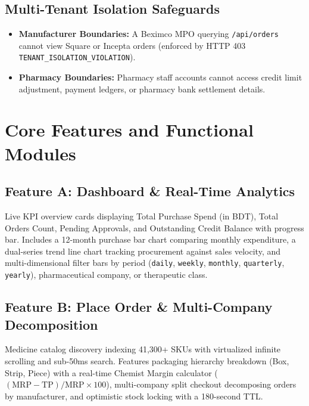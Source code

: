 \documentclass[10pt,a4paper]{article}
\begin{document}
\subsection{Multi-Tenant Isolation Safeguards}
\begin{itemize}[leftmargin=*]
    \item \textbf{Manufacturer Boundaries:} A Beximco MPO querying \texttt{/api/orders} cannot view Square or Incepta orders (enforced by HTTP 403 \texttt{TENANT\_ISOLATION\_VIOLATION}).
    \item \textbf{Pharmacy Boundaries:} Pharmacy staff accounts cannot access credit limit adjustment, payment ledgers, or pharmacy bank settlement details.
\end{itemize}

\section{Core Features and Functional Modules}

\subsection{Feature A: Dashboard \& Real-Time Analytics}
Live KPI overview cards displaying Total Purchase Spend (in BDT), Total Orders Count, Pending Approvals, and Outstanding Credit Balance with progress bar. Includes a 12-month purchase bar chart comparing monthly expenditure, a dual-series trend line chart tracking procurement against sales velocity, and multi-dimensional filter bars by period (\texttt{daily}, \texttt{weekly}, \texttt{monthly}, \texttt{quarterly}, \texttt{yearly}), pharmaceutical company, or therapeutic class.

\subsection{Feature B: Place Order \& Multi-Company Decomposition}
Medicine catalog discovery indexing 41,300+ SKUs with virtualized infinite scrolling and sub-50ms search. Features packaging hierarchy breakdown (Box, Strip, Piece) with a real-time Chemist Margin calculator ($(\text{MRP} - \text{TP}) / \text{MRP} \times 100$), multi-company split checkout decomposing orders by manufacturer, and optimistic stock locking with a 180-second TTL.
\end{document}
